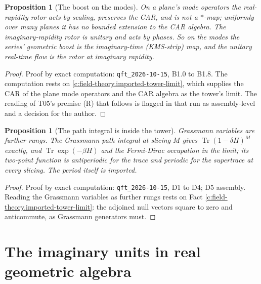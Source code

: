 \documentclass[11pt]{article}
\newtheorem{proposition}[theorem]{Proposition}
\theoremstyle{definition}
\theoremstyle{plain}
\begin{document}
\begin{proposition}[The boost on the modes]\label{c:field-theory.boost-modes}
On a plane's mode operators the real-rapidity rotor acts by scaling, preserves the CAR, and is not a $*$-map; uniformly over many planes it has no bounded extension to the CAR algebra. The imaginary-rapidity rotor is unitary and acts by phases. So on the modes the series' geometric boost is the imaginary-time (KMS-strip) map, and the unitary real-time flow is the rotor at imaginary rapidity.
\end{proposition}
\begin{proof}
Proof by exact computation: \texttt{qft\_2026-10-15}, B1.0 to B1.8. The computation rests on \ref{c:field-theory.imported-tower-limit}, which supplies the CAR of the plane mode operators and the CAR algebra as the tower's limit. The reading of T05's premise (R) that follows is flagged in that run as assembly-level and a decision for the author.

\end{proof}

\begin{proposition}[The path integral is inside the tower]\label{c:field-theory.path-integral-inside-tower}
Grassmann variables are further rungs. The Grassmann path integral at slicing $M$ gives $\operatorname{Tr}(1 - \delta H)^M$ exactly, and $\operatorname{Tr}\exp(-\beta H)$ and the Fermi-Dirac occupation in the limit; its two-point function is antiperiodic for the trace and periodic for the supertrace at every slicing. The period itself is imported.
\end{proposition}
\begin{proof}
Proof by exact computation: \texttt{qft\_2026-10-15}, D1 to D4; D5 assembly. Reading the Grassmann variables as further rungs rests on Fact \ref{c:field-theory.imported-tower-limit}: the adjoined null vectors square to zero and anticommute, as Grassmann generators must.

\end{proof}

\section{The imaginary units in real geometric algebra}
\end{document}
